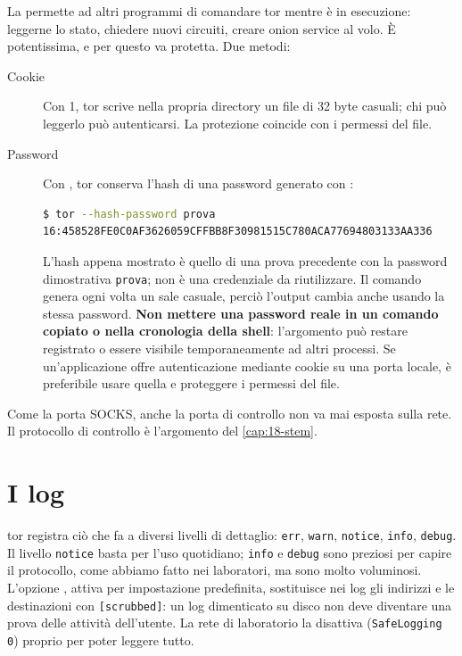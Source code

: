 La  permette ad altri programmi di comandare tor mentre è in esecuzione: leggerne lo stato, chiedere nuovi circuiti, creare onion service al volo. È potentissima, e per questo va protetta. Due metodi:
\begin{description}
  \item[Cookie] Con  1, tor scrive nella propria directory un file di 32 byte casuali; chi può leggerlo può autenticarsi. La protezione coincide con i permessi del file.
  \item[Password] Con , tor conserva l'hash di una password generato con :
\begin{lstlisting}[language=bash,numbers=none]
$ tor --hash-password prova
16:458528FE0C0AF3626059CFFBB8F30981515C780ACA77694803133AA336
\end{lstlisting}
L'hash appena mostrato è quello di una prova precedente con la password dimostrativa \texttt{prova}; non è una credenziale da riutilizzare. Il comando genera ogni volta un sale casuale, perciò l'output cambia anche usando la stessa password. \textbf{Non mettere una password reale in un comando copiato o nella cronologia della shell}: l'argomento può restare registrato o essere visibile temporaneamente ad altri processi. Se un'applicazione offre autenticazione mediante cookie su una porta locale, è preferibile usare quella e proteggere i permessi del file.
\end{description}
Come la porta SOCKS, anche la porta di controllo non va mai esposta sulla rete. Il protocollo di controllo è l'argomento del \cref{cap:18-stem}.

\section{I log}\label{sec:torrc-log}

tor registra ciò che fa a diversi livelli di dettaglio: \texttt{err}, \texttt{warn}, \texttt{notice}, \texttt{info}, \texttt{debug}. Il livello \texttt{notice} basta per l'uso quotidiano; \texttt{info} e \texttt{debug} sono preziosi per capire il protocollo, come abbiamo fatto nei laboratori, ma sono molto voluminosi. L'opzione , attiva per impostazione predefinita, sostituisce nei log gli indirizzi e le destinazioni con \texttt{[scrubbed]}: un log dimenticato su disco non deve diventare una prova delle attività dell'utente. La rete di laboratorio la disattiva (\texttt{SafeLogging 0}) proprio per poter leggere tutto.

